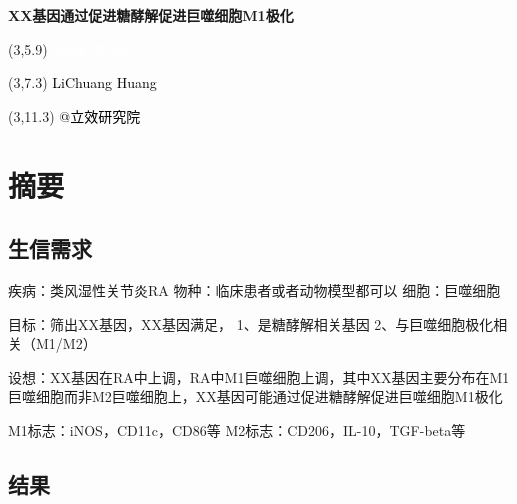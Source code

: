 \documentclass[
]{article}
\author{}
\date{\vspace{-2.5em}}
\begin{document}
\begin{titlepage} 
\begin{center} \textbf{\Huge
XX基因通过促进糖酵解促进巨噬细胞M1极化}
\vspace{4em} \begin{textblock}{10}(3,5.9) \huge
\textbf{\textcolor{white}{2024-05-06}}
\end{textblock} \begin{textblock}{10}(3,7.3)
\Large \textcolor{black}{LiChuang Huang}
\end{textblock} \begin{textblock}{10}(3,11.3)
\Large \textcolor{black}{@立效研究院}
\end{textblock} \end{center} \end{titlepage}
\restoregeometry


\tableofcontents

\listoffigures

\listoftables

\newpage


\hypertarget{abstract}{%
\section{摘要}\label{abstract}}

\hypertarget{ux751fux4fe1ux9700ux6c42}{%
\subsection{生信需求}\label{ux751fux4fe1ux9700ux6c42}}

疾病：类风湿性关节炎RA
物种：临床患者或者动物模型都可以
细胞：巨噬细胞

目标：筛出XX基因，XX基因满足，
1、是糖酵解相关基因
2、与巨噬细胞极化相关（M1/M2）

设想：XX基因在RA中上调，RA中M1巨噬细胞上调，其中XX基因主要分布在M1巨噬细胞而非M2巨噬细胞上，XX基因可能通过促进糖酵解促进巨噬细胞M1极化

M1标志：iNOS，CD11c，CD86等
M2标志：CD206，IL-10，TGF-beta等

\hypertarget{ux7ed3ux679c}{%
\subsection{结果}\label{ux7ed3ux679c}}
\end{document}
